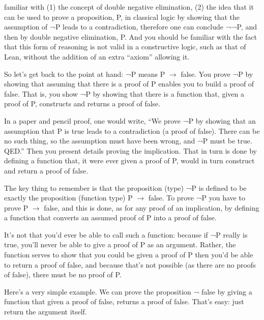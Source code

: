 \documentclass[letterpaper,10pt,english]{sphinxmanual}
\begin{document}
familiar with (1) the concept of double negative elimination, (2) the
idea that it can be used to prove a proposition, P, in classical logic
by showing that the assumption of ¬P leads to a contradiction,
therefore one can conclude ¬¬P, and then by double negative
elimination, P. And you should be familiar with the fact that this
form of reasoning is not valid in a constructive logic, such as that
of Lean, without the addition of an extra “axiom” allowing it.

So let’s get back to the point at hand: ¬P means P \(\rightarrow\) false. You prove
¬P by showing that assuming that there is a proof of P enables you to
build a proof of false. That is, you show ¬P by showing that there is
a function that, given a proof of P, constructs and returns a proof of
false.

In a paper and pencil proof, one would write, “We prove ¬P by showing
that an assumption that P is true leads to a contradiction (a proof of
false). There can be no such thing, so the assumption must have been
wrong, and ¬P must be true. QED.” Then you present details proving the
implication. That in turn is done by defining a function that,  it
were ever given a proof of P, would in turn construct and return a
proof of false.

The key thing to remember is that the proposition (type) ¬P is defined
to be exactly the proposition (function type) P \(\rightarrow\) false. To prove ¬P
you have to prove P \(\rightarrow\) false, and this is done, as for any proof of an
implication, by defining a function that converts an assumed proof of
P into a proof of false.

It’s not that you’d ever be able to call such a function: because if
¬P really is true, you’ll never be able to give a proof of P as an
argument.  Rather, the function serves to show that  you could be
given a proof of P then you’d be able to return a proof of false, and
because that’s not possible (as there are no proofs of false), there
must be no proof of P.

Here’s a very simple example. We can prove the proposition ¬ false by
giving a function that  given a proof of false, returns a proof of
false. That’s easy: just return the argument itself.

\begin{sphinxVerbatim}[commandchars=\\\{\}]
   
       
\end{sphinxVerbatim}
\end{document}
